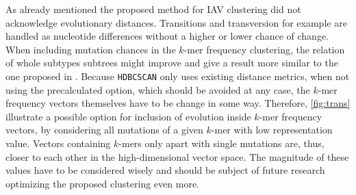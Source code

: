 As already mentioned the proposed method for \gls{IAV} clustering did not acknowledge evolutionary distances. Transitions and transversion for example are handled as nucleotide differences without a higher or lower chance of change. When including mutation chances in the $k$-mer frequency clustering, the relation of whole subtypes subtrees might improve and give a result more similar to the one proposed in \textcite{wei_next-generation_2020}. Because \texttt{HDBCSCAN} only uses existing distance metrics, when not using the precalculated option, which should be avoided at any case, the $k$-mer frequency vectors themselves have to be change in some way. Therefore, \autoref{fig:trans} illustrate a possible option for inclusion of evolution inside $k$-mer frequency vectors, by considering all mutations of a given $k$-mer with low representation value. Vectors containing $k$-mers only apart with single mutations are, thus, closer to each other in the high-dimensional vector space. The magnitude of these values have to be considered wisely and should be subject of future research optimizing the proposed clustering even more.